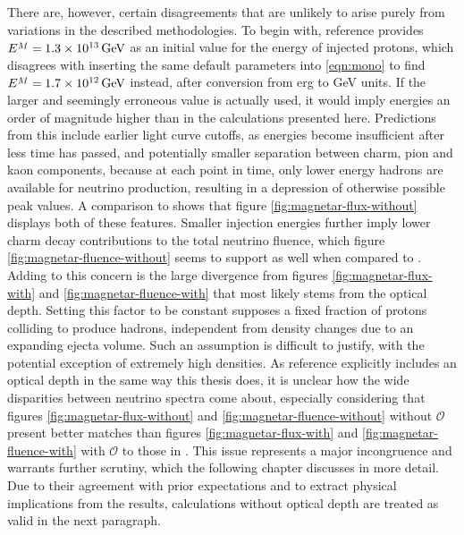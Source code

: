 There are, however, certain disagreements that are unlikely to arise purely from variations in the described methodologies. To begin with,
reference \cite{Carpio_2020} provides $\cramped{E^M} = \kern-0.5pt \smash{\qty{1.3e13}{\giga\electronvolt}}$ as an initial value for the
energy of injected protons, which disagrees with inserting the same default parameters into \eqref{eqn:mono} to find
$\cramped{E^M} = \kern-0.5pt \smash{\qty{1.7e12}{\giga\electronvolt}}$ instead, after conversion from \unit{erg} to \unit{\giga\electronvolt}
units. If the larger and seemingly erroneous value is actually used, it would imply energies an order of magnitude higher than in the
calculations presented here. Predictions from this include earlier light curve cutoffs, as energies become insufficient after less time
has passed, and potentially smaller separation between charm, pion and kaon components, because at each point in time, only lower
energy hadrons are available for neutrino production, resulting in a depression of otherwise possible peak values. A comparison to
\cite{Carpio_2020} shows that figure \ref{fig:magnetar-flux-without} displays both of these features. Smaller injection energies
further imply lower charm decay contributions to the total neutrino fluence, which figure \ref{fig:magnetar-fluence-without} seems
to support as well when compared to \cite{Carpio_2020}. Adding to this concern is the large divergence from figures
\ref{fig:magnetar-flux-with} and \ref{fig:magnetar-fluence-with} that most likely stems from the optical depth. Setting this
factor to be constant supposes a fixed fraction of protons colliding to produce hadrons, independent from density changes
due to an expanding ejecta volume. Such an assumption is difficult to justify, with the potential exception
of extremely high densities. As reference \cite{Carpio_2020} explicitly includes an optical depth in the same way
this thesis does, it is unclear how the wide disparities between neutrino spectra come about, especially
considering that figures \ref{fig:magnetar-flux-without} and \ref{fig:magnetar-fluence-without} without $\mathscr{O}$ present
better matches than figures \ref{fig:magnetar-flux-with} and \ref{fig:magnetar-fluence-with} with $\mathscr{O}$ to those in \cite{Carpio_2020}.
This issue represents a major incongruence and warrants further scrutiny, which the following chapter discusses in more detail. Due to their
agreement with prior expectations and to extract physical implications from the results, calculations without optical depth are treated as
valid in the next paragraph.

